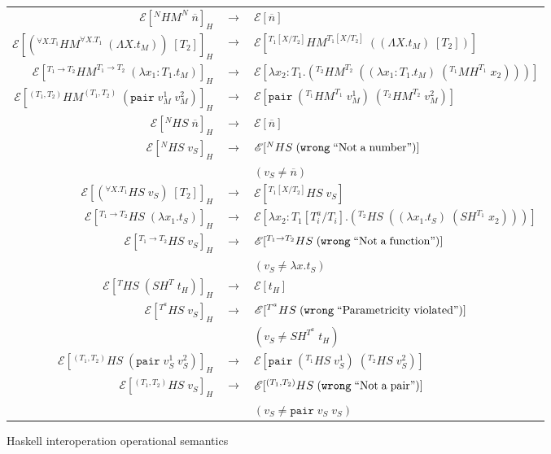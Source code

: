 \begin{figure}
\onehalfspacing
\begin{center}
\begin{tabular}{rcl}
$\mathscr{E}[^{N}HM^{N}\;\overline{n}]_{H}$ & $\rightarrow$ & $\mathscr{E}[\overline{n}]$ \\
$\mathscr{E}[(^{\forall X.T_{1}}HM^{\forall X.T_{1}}\;(\Lambda X.t_{M}))\;[T_{2}]]_{H}$ & $\rightarrow$ & $\mathscr{E}[^{T_{1}[X/T_{2}]}HM^{T_{1}[X/T_{2}]}\;((\Lambda X.t_{M})\;[T_{2}])]$ \\
$\mathscr{E}[^{T_{1}\rightarrow T_{2}}HM^{T_{1}\rightarrow T_{2}}\;(\lambda x_{1}:T_{1}.t_{M})]_{H}$ & $\rightarrow$ & $\mathscr{E}[\lambda x_{2}:T_{1}.(^{T_{2}}HM^{T_{2}}\;((\lambda x_{1}:T_{1}.t_{M})\;(^{T_{1}}MH^{T_{1}}\;x_{2})))]$ \\
$\mathscr{E}[^{(T_{1},T_{2})}HM^{(T_{1},T_{2})}\;(\mathtt{pair}\;v_{M}^{1}\;v_{M}^{2})]_{H}$ & $\rightarrow$ & $\mathscr{E}[\mathtt{pair}\;(^{T_{1}}HM^{T_{1}}\;v_{M}^{1})\;(^{T_{2}}HM^{T_{2}}\;v_{M}^{2})]$ \\
$\mathscr{E}[^{N}HS\;\overline{n}]_{H}$ & $\rightarrow$ & $\mathscr{E}[\overline{n}]$ \\
$\mathscr{E}[^{N}HS\;v_{S}]_{H}$ & $\rightarrow$ & $\mathscr{E}[^{N}HS\;(\mathtt{wrong}\;\mathrm{``Not\;a\;number"})]$ \\
&& $(v_{S}\neq\overline{n})$ \\
$\mathscr{E}[(^{\forall X.T_{1}}HS\;v_{S})\;[T_{2}]]_{H}$ & $\rightarrow$ & $\mathscr{E}[^{T_{1}[X/T_{2}]}HS\;v_{S}]$ \\
$\mathscr{E}[^{T_{1}\rightarrow T_{2}}HS\;(\lambda x_{1}.t_{S})]_{H}$ & $\rightarrow$ & $\mathscr{E}[\lambda x_{2}:T_{1}[T^{a}_{i}/T_{i}].(^{T_{2}}HS\;((\lambda x_{1}.t_{S})\;(SH^{T_{1}}\;x_{2})))]$ \\
$\mathscr{E}[^{T_{1}\rightarrow T_{2}}HS\;v_{S}]_{H}$ & $\rightarrow$ & $\mathscr{E}[^{T_{1}\rightarrow T_{2}}HS\;(\mathtt{wrong}\;\mathrm{``Not\;a\;function"})]$ \\
&& $(v_{S}\neq\lambda x.t_{S})$ \\
$\mathscr{E}[^{T}HS\;(SH^{T}\;t_{H})]_{H}$ & $\rightarrow$ & $\mathscr{E}[t_{H}]$ \\
$\mathscr{E}[^{T^{a}}HS\;v_{S}]_{H}$ & $\rightarrow$ & $\mathscr{E}[^{T^{a}}HS\;(\mathtt{wrong}\;\mathrm{``Parametricity\;violated"})]$ \\
&& $(v_{S}\neq SH^{T^{a}}\;t_{H})$ \\
$\mathscr{E}[^{(T_{1},T_{2})}HS\;(\mathtt{pair}\;v_{S}^{1}\;v_{S}^{2})]_{H}$ & $\rightarrow$ & $\mathscr{E}[\mathtt{pair}\;(^{T_{1}}HS\;v_{S}^{1})\;(^{T_{2}}HS\;v_{S}^{2})]$ \\
$\mathscr{E}[^{(T_{1},T_{2})}HS\;v_{S}]_{H}$ & $\rightarrow$ & $\mathscr{E}[^{(T_{1},T_{2})}HS\;(\mathtt{wrong}\;\mathrm{``Not\;a\;pair"})]$ \\
&& $(v_{S}\neq\mathtt{pair}\;v_{S}\;v_{S})$
\end{tabular}
\end{center}
\caption{Haskell interoperation operational semantics}
\label{fig:hios}
\end{figure}